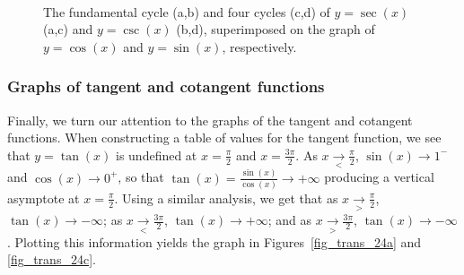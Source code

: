 \begin{figure}
\centering{}\\
	\caption{The fundamental cycle (a,b) and four cycles (c,d) of $y=\sec(x)$ (a,c) and $y=\csc(x)$ (b,d), superimposed on the graph of $y=\cos(x)$ and $y=\sin(x)$, respectively.}
\end{figure}
\fi

\subsubsection{Graphs of tangent and cotangent functions}
Finally, we turn our attention to the graphs of the tangent and cotangent functions.  When constructing a table of values for the tangent function, we see that $y = \tan(x)$ is undefined at $x  = \frac{\pi}{2}$ and $x = \frac{3\pi}{2}$.  As $x \underset{<}{\rightarrow} \frac{\pi}{2}$, $\sin(x) \rightarrow 1^{-}$ and $\cos(x) \rightarrow 0^{+}$, so that $\tan(x)  = \frac{\sin(x)}{\cos(x)}\rightarrow +\infty$ producing a vertical asymptote at $x = \frac{\pi}{2}$.  Using a similar analysis, we get that as $x \underset{>}{\rightarrow} \frac{\pi}{2}$, $\tan(x) \rightarrow -\infty$; as $x \underset{<}{\rightarrow} \frac{3\pi}{2}$, $\tan(x) \rightarrow +\infty$; and as $x \underset{>}{\rightarrow} \frac{3\pi}{2}$, $\tan(x) \rightarrow -\infty$.  Plotting this information yields the graph in Figures~\ref{fig_trans_24a} and \ref{fig_trans_24c}. 


